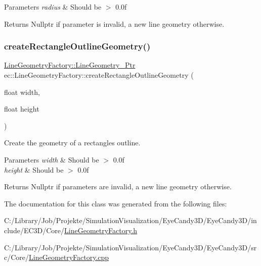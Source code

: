 \begin{DoxyParams}{Parameters}
{\em radius} & Should be $>$ 0.\+0f \\
\hline
\end{DoxyParams}
\begin{DoxyReturn}{Returns}
Nullptr if parameter is invalid, a new line geometry otherwise. 
\end{DoxyReturn}
\mbox{\label{classec_1_1_line_geometry_factory_ad5a4cbba96cb7d6fa979e6266c7a8912}} 
\subsubsection{\texorpdfstring{create\+Rectangle\+Outline\+Geometry()}{createRectangleOutlineGeometry()}}
{\footnotesize\ttfamily \mbox{\hyperlink{classec_1_1_line_geometry_factory_a8f7bd7480ebc0dbc77930d81dcb69678}{Line\+Geometry\+Factory\+::\+Line\+Geometry\+\_\+\+Ptr}} ec\+::\+Line\+Geometry\+Factory\+::create\+Rectangle\+Outline\+Geometry (\begin{DoxyParamCaption}\item[{float}]{width,  }\item[{float}]{height }\end{DoxyParamCaption})\hspace{0.3cm}{\ttfamily [static]}}



Create the geometry of a rectangle\textquotesingle{}s outline. 


\begin{DoxyParams}{Parameters}
{\em width} & Should be $>$ 0.\+0f \\
\hline
{\em height} & Should be $>$ 0.\+0f \\
\hline
\end{DoxyParams}
\begin{DoxyReturn}{Returns}
Nullptr if parameters are invalid, a new line geometry otherwise. 
\end{DoxyReturn}


The documentation for this class was generated from the following files\+:\begin{DoxyCompactItemize}
\item 
C\+:/\+Library/\+Job/\+Projekte/\+Simulation\+Visualization/\+Eye\+Candy3\+D/\+Eye\+Candy3\+D/include/\+E\+C3\+D/\+Core/\mbox{\hyperlink{_line_geometry_factory_8h}{Line\+Geometry\+Factory.\+h}}\item 
C\+:/\+Library/\+Job/\+Projekte/\+Simulation\+Visualization/\+Eye\+Candy3\+D/\+Eye\+Candy3\+D/src/\+Core/\mbox{\hyperlink{_line_geometry_factory_8cpp}{Line\+Geometry\+Factory.\+cpp}}\end{DoxyCompactItemize}

